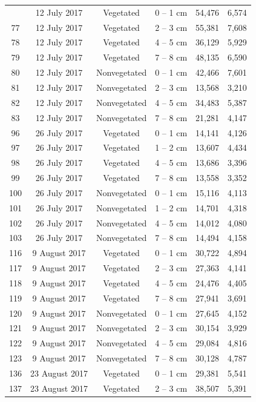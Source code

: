 \documentclass[12pt,]{article}
\begin{document}
\begin{longtable}[t]{cccccc}
\endfoot
\bottomrule
\endlastfoot
76 & 12 July 2017 & Vegetated & 0 – 1 cm & 54,476 & 6,574\\
77 & 12 July 2017 & Vegetated & 2 – 3 cm & 55,381 & 7,608\\
78 & 12 July 2017 & Vegetated & 4 – 5 cm & 36,129 & 5,929\\
79 & 12 July 2017 & Vegetated & 7 – 8 cm & 48,135 & 6,590\\
80 & 12 July 2017 & Nonvegetated & 0 – 1 cm & 42,466 & 7,601\\
81 & 12 July 2017 & Nonvegetated & 2 – 3 cm & 13,568 & 3,210\\
82 & 12 July 2017 & Nonvegetated & 4 – 5 cm & 34,483 & 5,387\\
83 & 12 July 2017 & Nonvegetated & 7 – 8 cm & 21,281 & 4,147\\
96 & 26 July 2017 & Vegetated & 0 – 1 cm & 14,141 & 4,126\\
97 & 26 July 2017 & Vegetated & 1 – 2 cm & 13,607 & 4,434\\
98 & 26 July 2017 & Vegetated & 4 – 5 cm & 13,686 & 3,396\\
99 & 26 July 2017 & Vegetated & 7 – 8 cm & 13,558 & 3,352\\
100 & 26 July 2017 & Nonvegetated & 0 – 1 cm & 15,116 & 4,113\\
101 & 26 July 2017 & Nonvegetated & 1 – 2 cm & 14,701 & 4,318\\
102 & 26 July 2017 & Nonvegetated & 4 – 5 cm & 14,012 & 4,080\\
103 & 26 July 2017 & Nonvegetated & 7 – 8 cm & 14,494 & 4,158\\
116 & 9 August 2017 & Vegetated & 0 – 1 cm & 30,722 & 4,894\\
117 & 9 August 2017 & Vegetated & 2 – 3 cm & 27,363 & 4,141\\
118 & 9 August 2017 & Vegetated & 4 – 5 cm & 24,476 & 4,405\\
119 & 9 August 2017 & Vegetated & 7 – 8 cm & 27,941 & 3,691\\
120 & 9 August 2017 & Nonvegetated & 0 – 1 cm & 27,645 & 4,152\\
121 & 9 August 2017 & Nonvegetated & 2 – 3 cm & 30,154 & 3,929\\
122 & 9 August 2017 & Nonvegetated & 4 – 5 cm & 29,084 & 4,816\\
123 & 9 August 2017 & Nonvegetated & 7 – 8 cm & 30,128 & 4,787\\
136 & 23 August 2017 & Vegetated & 0 – 1 cm & 29,381 & 5,541\\
137 & 23 August 2017 & Vegetated & 2 – 3 cm & 38,507 & 5,391\\

\end{longtable}
\end{document}
